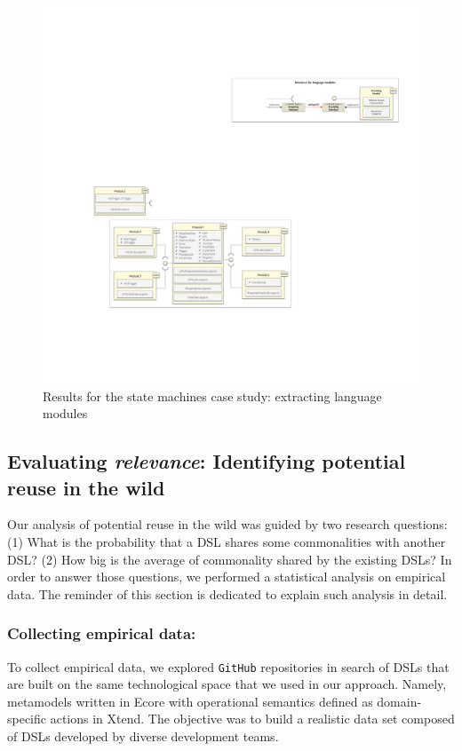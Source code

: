 \begin{figure}[h!]
\centering
\includegraphics[width=1\linewidth]{images/puzzle-modularization.pdf}
\caption{Results for the state machines case study: extracting language modules}
\label{fig:puzzle-modularization}
\end{figure}

\subsection{Evaluating \textit{relevance}: Identifying potential reuse in the wild}

Our analysis of potential reuse in the wild was guided by two research questions: (1) What is the probability that a DSL shares some commonalities with another DSL? (2) How big is the average of commonality shared by the existing DSLs? In order to answer those questions, we performed a statistical analysis on empirical data. The reminder of this section is dedicated to explain such analysis in detail. 

\vspace{-3mm}
\subsubsection{Collecting empirical data:} To collect empirical data, we explored \texttt{GitHub} repositories in search of DSLs that are built on the same technological space that we used in our approach. Namely, metamodels written in Ecore with operational semantics defined as domain-specific actions in Xtend. The objective was to build a realistic data set composed of DSLs developed by diverse development teams. 

